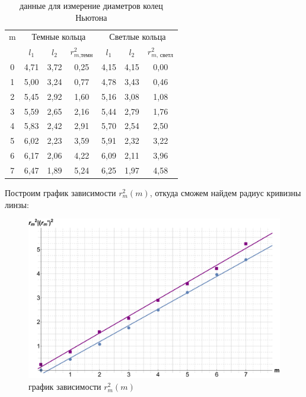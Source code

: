 \documentclass[a4paper, 12pt]{article}%
\begin{document}
\begin{table}[h!]
		\begin{center}
			\begin{tabular}{|c|c|c|c|c|c|c|}
				\hline
				m & \multicolumn{3}{|c|}{Темные кольца} & \multicolumn{3}{|c|}{Светлые кольца} \\
				\cline{2-7}
				& $ l_1 $& $ l_2 $ & $ r_{m\text{,темн}}^2 $ &$ l_1 $& $ l_2 $ & $ r_{m\text{, светл}}^2 $ \\
				\hline
				0 & 4,71 & 3,72 & 0,25 & 4,15 & 4,15 & 0,00 \\
				1 & 5,00 & 3,24 & 0,77 & 4,78 & 3,43 & 0,46 \\
				2 & 5,45 & 2,92 & 1,60 & 5,16 & 3,08 & 1,08 \\
				3 & 5,59 & 2,65 & 2,16 & 5,44 & 2,79 & 1,76 \\
				4 & 5,83 & 2,42 & 2,91 & 5,70 & 2,54 & 2,50 \\
				5 & 6,02 & 2,23 & 3,59 & 5,91 & 2,32 & 3,22 \\
				6 & 6,17 & 2,06 & 4,22 & 6,09 & 2,11 & 3,96 \\
				7 & 6,47 & 1,89 & 5,24 & 6,25 & 1,97 & 4,58 \\
				\hline
			\end{tabular}
		\end{center}
		\caption{данные для измерение диаметров колец Ньютона}
		\label{tab1}
	\end{table}

Построим график зависимости $r_m^2 (m)$, откуда сможем найдем радиус кривизны линзы:

\newpage

	\begin{figure}[!h]
	\includegraphics[width=\linewidth]{graph1.pdf}
	\caption{график зависимости $r_m^2 (m)$}
	\label{2}
	\end{figure}
\end{document}
